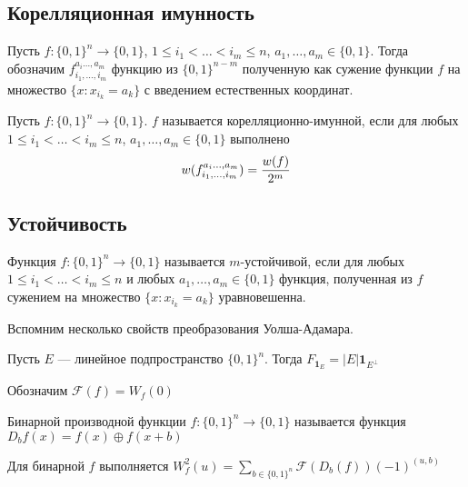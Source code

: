 \subsection{Корелляционная имунность}
\begin{definition}
Пусть $f: \{0,1\}^n \to \{0,1\}$, $1 \le i_1 < \ldots < i_m \le n$,
 $a_1, \ldots, a_m \in \{0,1\}$. Тогда
обозначим $f_{i_1, \ldots, i_m}^{a_i \ldots, a_m}$ функцию из
 $\{0,1\}^{n-m}$ полученную как сужение функции $f$ на множество
   $\{x \colon x_{i_k} = a_k\}$ с введением естественных координат.
\end{definition}

\begin{definition}
Пусть $f: \{0,1\}^n \to \{0,1\}$. $f$ называется корелляционно-имунной, если
 для любых $1 \le i_1 < \ldots < i_m \le n$, $a_1, \ldots, a_m \in \{0,1\}$
 выполнено
 $$w(f_{i_1, \ldots, i_m}^{a_i \ldots, a_m}) = {w(f) \over 2^m}$$
\end{definition}

\subsection{Устойчивость}
\begin{definition}
Функция $f: \{0,1\}^n \to \{0,1\}$ называется $m$-устойчивой, если для любых $1 \le i_1 < \ldots < i_m \le n$
и любых $a_1, \ldots, a_m \in \{0,1\}$ функция, полученная из $f$ сужением на множество $\{x \colon x_{i_k} = a_k\}$
уравновешенна. 
\end{definition}

Вспомним несколько свойств преобразования Уолша-Адамара.

\begin{proposition}
Пусть $E$ --- линейное подпространство $\{0,1\}^n$. Тогда $F_{\mathbf{1}_E} = |E| \mathbf{1}_{E^{\bot}}$
\end{proposition}
\newcommand{\FF}[0]{\mathscr{F}}
\begin{definition}
Обозначим $\FF(f) = W_f(0)$
\end{definition}

\begin{definition}
Бинарной производной функции $f: \{0,1\}^n \to \{0,1\}$ называется функция $D_b f (x) = f(x) \oplus f(x+b)$
\end{definition}

\begin{proposition}
Для бинарной $f$ выполняется $W_f^2(u) = \sum\limits_{b \in \{0,1\}^n} \FF(D_b(f)) (-1)^{(u,b)}$
\end{proposition}

